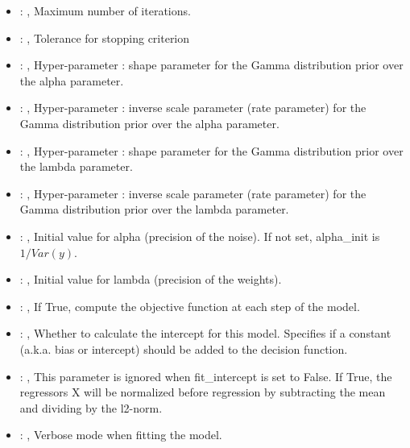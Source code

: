 \begin{itemize}
    \item {}: , 
      Maximum number of iterations.

    \item {}: , 
      Tolerance for stopping criterion

    \item {}: , 
      Hyper-parameter : shape parameter for the Gamma
      distribution prior over the alpha parameter.

    \item {}: , 
      Hyper-parameter : inverse scale parameter (rate parameter)
      for the Gamma distribution prior over the alpha parameter.

    \item {}: , 
      Hyper-parameter : shape parameter for the Gamma distribution
      prior over the lambda parameter.

    \item {}: , 
      Hyper-parameter : inverse scale parameter (rate parameter) for
      the Gamma distribution prior over the lambda parameter.

    \item {}: , 
      Initial value for alpha (precision of the noise).
      If not set, alpha\_init is $1/Var(y)$.

    \item {}: , 
      Initial value for lambda (precision of the weights).

    \item {}: , 
      If True, compute the objective function at each step of the
      model.

    \item {}: , 
      Whether to calculate the intercept for this model. Specifies if a constant (a.k.a. bias or
      intercept)                                                   should be added to the decision
      function.

    \item {}: , 
      This parameter is ignored when fit\_intercept is set to False. If True,
      the regressors X will be normalized before regression by subtracting the mean and
      dividing by the l2-norm.

    \item {}: , 
      Verbose mode when fitting the model.
  \end{itemize}


